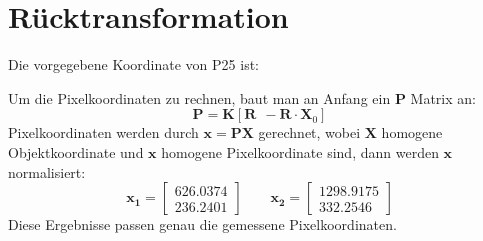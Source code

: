 \documentclass[12pt]{article}
\begin{document}
\section{Rücktransformation}
Die vorgegebene Koordinate von P25 ist:
\begin{figure}[ht]\centering
\end{figure}
\newline
Um die Pixelkoordinaten zu rechnen, baut man an Anfang ein $\bm{P}$ Matrix an:
\begin{equation*}
\bm{P} = \bm{K} \left[ \bm{R} \ \ -\bm{R} \cdot \bm{X}_0\right]
\end{equation*}
Pixelkoordinaten werden durch $\bm{x} = \bm{P} \bm{X}$ gerechnet, wobei $\bm{X}$ homogene Objektkoordinate und $\bm{x}$ homogene Pixelkoordinate sind, dann werden $\bm{x}$ normalisiert: 
\begin{equation*}
\bm{x_1} = \begin{bmatrix}
626.0374 \\
236.2401
\end{bmatrix} \qquad \bm{x_2} = \begin{bmatrix}
1298.9175 \\
332.2546
\end{bmatrix}
\end{equation*}
Diese Ergebnisse passen genau die gemessene Pixelkoordinaten. 
\end{document}
